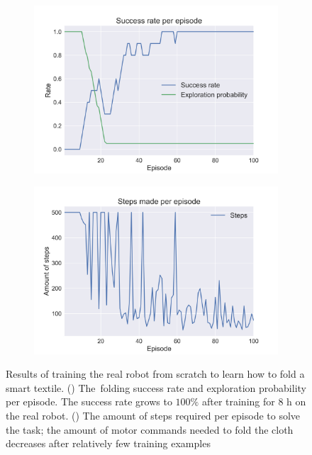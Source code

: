 \documentclass[\home/main.tex]{subfiles}
\begin{document}
\begin{figure}[htpb]{}
    \centering
    \begin{subfigure}[b][]{0.9\textwidth}
        \centering
        \includegraphics[width=\linewidth]{figures/avg-success-rate.jpg}
        \subcaption{}
        \label{fig:instrumentation_results_success_rate}
    \end{subfigure}

    \begin{subfigure}[b][]{0.9\textwidth}
        \centering
        \includegraphics[width=\linewidth]{figures/steps.jpg}
        \subcaption{}
        \label{fig:instrumentation_results_steps}
    \end{subfigure}
    
       \caption{Results of training the real robot from scratch to learn how to fold a smart textile. (\textbf{\protect{}}) The~folding success rate and exploration probability per episode. The success rate grows to $100\%$ after training for $8$ h on the real robot. (\textbf{\protect{}}) The amount of steps required per episode to solve the task; the amount of motor commands needed to fold the cloth decreases after relatively few training examples}
       \label{fig:instrumentation_results}
\end{figure}
\end{document}
